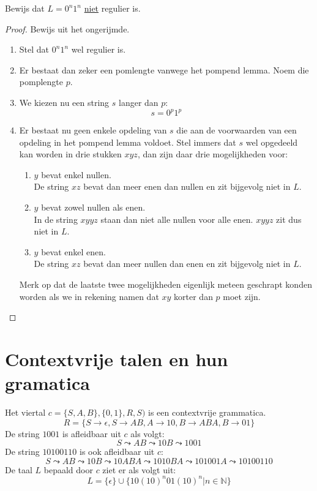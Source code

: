 \documentclass[main.tex]{subfiles}
\begin{document}
\begin{vb}
  \label{vb:0n-1n-niet-regulier}
  Bewijs dat $L = 0^{n}1^{n}$ \underline{niet} regulier is.
  \begin{proof}
    Bewijs uit het ongerijmde.
    \begin{enumerate}
    \item Stel dat $0^{n}1^{n}$ wel regulier is.
    \item Er bestaat dan zeker een pomlengte vanwege het pompend lemma.
      Noem die pomplengte $p$.
    \item We kiezen nu een string $s$ langer dan $p$:
      \[ s = 0^{p}1^{p} \]
    \item Er bestaat nu geen enkele opdeling van $s$ die aan de voorwaarden van een opdeling in het pompend lemma voldoet.
      Stel immers dat $s$ wel opgedeeld kan worden in drie stukken $xyz$, dan zijn daar drie mogelijkheden voor:
      \begin{enumerate}
      \item $y$ bevat enkel nullen.\\
        De string $xz$ bevat dan meer enen dan nullen en zit bijgevolg niet in $L$.
      \item $y$ bevat zowel nullen als enen.\\
        In de string $xyyz$ staan dan niet alle nullen voor alle enen. $xyyz$ zit dus niet in $L$. 
      \item $y$ bevat enkel enen.\\
        De string $xz$ bevat dan meer nullen dan enen en zit bijgevolg niet in $L$.
      \end{enumerate}
      Merk op dat de laatste twee mogelijkheden eigenlijk meteen geschrapt konden worden als we in rekening namen dat $xy$ korter dan $p$ moet zijn.
    \end{enumerate}
  \end{proof}
\end{vb}


\section{Contextvrije talen en hun gramatica}
\label{sec:cont-talen-en}

\begin{vb}
  Het viertal $c = \{ S,A,B \},\{ 0,1 \},R,S)$ is een contextvrije grammatica.
  \[ R = \{ S \rightarrow \epsilon, S \rightarrow AB, A \rightarrow 10, B \rightarrow ABA, B \rightarrow 01 \} \]
  De string $1001$ is afleidbaar uit $c$ als volgt:
  \[ S \leadsto AB \leadsto 10B \leadsto 1001 \]
  De string $10100110$ is ook afleidbaar uit $c$:
  \[ S \leadsto AB \leadsto 10B \leadsto 10ABA \leadsto 1010BA \leadsto 101001A \leadsto 10100110 \]
  De taal $L$ bepaald door $c$ ziet er als volgt uit:
  \[ L = \{\epsilon\} \cup \{ 10 (10)^{n}01(10)^{n} | n \in \mathbb{N}\} \]
\end{vb}
\end{document}
